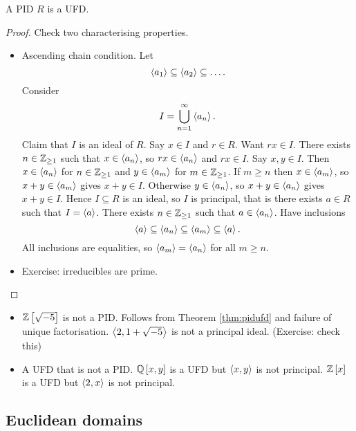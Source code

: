 \begin{theorem}
\label{thm:pidufd}
A PID $ R $ is a UFD.
\end{theorem}

\begin{proof}
Check two characterising properties.
\begin{itemize}
\item Ascending chain condition. Let
$$ \left\langle a_1 \right\rangle \subseteq \left\langle a_2 \right\rangle \subseteq \dots. $$
Consider
$$ I = \bigcup_{n = 1}^\infty \left\langle a_n \right\rangle. $$
Claim that $ I $ is an ideal of $ R $. Say $ x \in I $ and $ r \in R $. Want $ rx \in I $. There exists $ n \in \mathbb{Z}_{\ge 1} $ such that $ x \in \left\langle a_n \right\rangle $, so $ rx \in \left\langle a_n \right\rangle $ and $ rx \in I $. Say $ x, y \in I $. Then $ x \in \left\langle a_n \right\rangle $ for $ n \in \mathbb{Z}_{\ge 1} $ and $ y \in \left\langle a_m \right\rangle $ for $ m \in \mathbb{Z}_{\ge 1} $. If $ m \ge n $ then $ x \in \left\langle a_m \right\rangle $, so $ x + y \in \left\langle a_m \right\rangle $ gives $ x + y \in I $. Otherwise $ y \in \left\langle a_n \right\rangle $, so $ x + y \in \left\langle a_n \right\rangle $ gives $ x + y \in I $. Hence $ I \subseteq R $ is an ideal, so $ I $ is principal, that is there exists $ a \in R $ such that $ I = \left\langle a \right\rangle $. There exists $ n \in \mathbb{Z}_{\ge 1} $ such that $ a \in \left\langle a_n \right\rangle $. Have inclusions
$$ \left\langle a \right\rangle \subseteq \left\langle a_n \right\rangle \subseteq \left\langle a_m \right\rangle \subseteq \left\langle a \right\rangle. $$
All inclusions are equalities, so $ \left\langle a_m \right\rangle = \left\langle a_n \right\rangle $ for all $ m \ge n $.
\item Exercise: irreducibles are prime.
\end{itemize}
\end{proof}

\begin{remark*}
\hfill
\begin{itemize}
\item $ \mathbb{Z}\left[ \sqrt{-5} \right] $ is not a PID. Follows from Theorem \ref{thm:pidufd} and failure of unique factorisation. $ \left\langle 2, 1 + \sqrt{-5} \right\rangle $ is not a principal ideal. (Exercise: check this)
\item A UFD that is not a PID. $ \mathbb{Q}\left[ x, y \right] $ is a UFD but $ \left\langle x, y \right\rangle $ is not principal. $ \mathbb{Z}\left[ x \right] $ is a UFD but $ \left\langle 2, x \right\rangle $ is not principal.
\end{itemize}
\end{remark*}

\pagebreak

\subsection{Euclidean domains}


